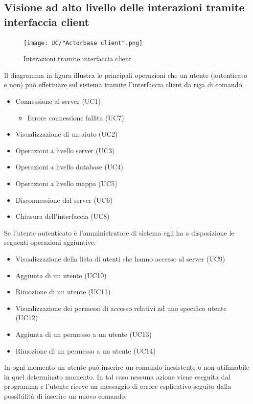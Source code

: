 \documentclass[a4paper]{article}
\begin{document}
		\subsection{Visione ad alto livello delle interazioni tramite interfaccia client}
		 	\begin{figure}[H]
				\centering
				\texttt{[image: UC/"Actorbase client".png]}
				\caption{Interazioni tramite interfaccia client}
			\end{figure}
			Il diagramma in figura illustra le principali operazioni che un utente (autenticato e non) può
			 effettuare sul sistema tramite l'interfaccia client da riga di comando. 
			\begin{itemize}
				\item Connessione al server (UC1)
				\begin{itemize}
					\item Errore connessione fallita (UC7)
				\end{itemize}
				\item Visualizzazione di un aiuto (UC2)
				\item Operazioni a livello server (UC3)
				\item Operazioni a livello database (UC4)
				\item Operazioni a livello mappa (UC5)
				\item Disconnessione dal server (UC6)
				\item Chiusura dell'interfaccia (UC8)
			\end{itemize}
			Se l'utente autenticato è l'amministratore di sistema egli ha a disposizione le seguenti operazioni aggiuntive:
			\begin{itemize}
				\item Visualizzazione della lista di utenti che hanno accesso al server (UC9)
				\item Aggiunta di un utente (UC10)
				\item Rimozione di un utente (UC11)
				\item Visualizzazione dei permessi di accesso relativi ad uno specifico utente (UC12)
				\item Aggiunta di un permesso a un utente (UC13)
				\item Rimozione di un permesso a un utente (UC14)
			\end{itemize}
	In ogni momento un utente può inserire un comando inesistente o non utilizzabile in quel determinato momento. In tal caso nessuna azione viene eseguita dal programma e l'utente riceve un messaggio di errore esplicativo seguito dalla possibilità di inserire un nuovo comando.	 
	 
\end{document}
